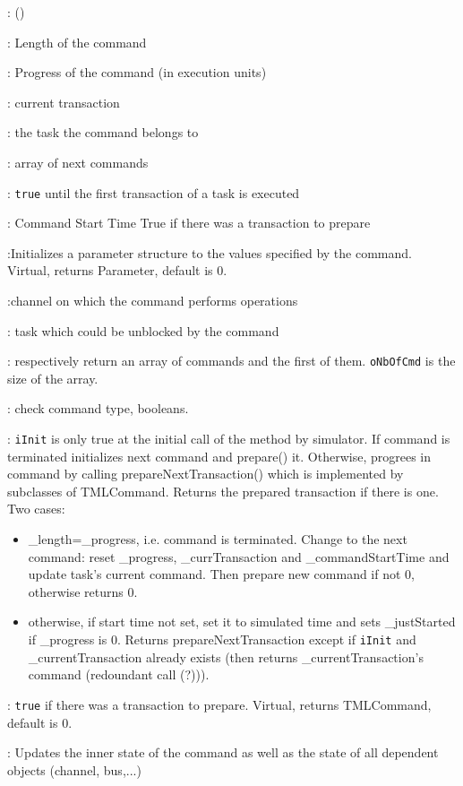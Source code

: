 \documentclass[a4paper,11pt]{article}
\newcommand{\bfont}{\fontseries{b}\selectfont}
\newcommand{\cod}[1]{{\ttfamily #1}}
\newcommand{\class}[2]{\par\vspace{1mm}\hspace{-5mm}\large\colorbox{file}{\textbullet\bfont\cod{#1}:} (\cod{#2})\par}
\newcommand{\method}[1]{\par\vspace{1mm}\hspace{-2mm}\colorbox{method}{\textopenbullet\bfont\cod{#1}:}}
\newcommand{\variable}[1]{\par\vspace{1mm}\hspace{-2mm}\colorbox{variable}{\textopenbullet\bfont\cod{#1}:}}
\begin{document}
\class{TMLCommand}{}
\variable{\_length} Length of the command
\variable{\_progress} Progress of the command (in execution units)
\variable{\_currTransaction} current transaction 
\variable{\_task} the task the command belongs to
\variable{\_nextCommand} array of  next commands
\variable{\_justStarted} {\tt true} until the first transaction of a task is executed
\variable{\_commandStartTime} Command Start Time
True if there was a transaction to prepare
\method{setParams(ioParam)}Initializes a parameter structure to the values specified by the command. Virtual, returns  Parameter, default is 0.
\method{getChannel(iIndex)}channel on which the command performs operations
\method{getDependentTask(iIndex)} task which could be unblocked by the command
\method{getNextCommands(oNbOfCmd), getNextCommands()} respectively return an array of commands and the first of them. {\tt oNbOfCmd} is the size of the array.
\method{isDelayTransaction(), getActiveDelay()} check command type, booleans.
\method{prepare(iInit)} {\tt iInit} is only true at the initial call of the method by simulator. If command is terminated initializes next command and \cod{prepare()} it. Otherwise, progrees in command by calling \cod{prepareNext\-Transaction()} which is implemented by subclasses of TMLCommand. Returns the prepared transaction if there is one. Two cases:
\begin{itemize}
	\item \cod{\_length}=\cod{\_progress}, i.e. command is terminated. Change to the next command: reset \cod{\_progress}, 
	\cod{\_currTransaction} and \cod{\_commandStartTime} and update task's current command. Then prepare new command if not 0, otherwise returns 0.
	\item otherwise, if start time not set, set it to simulated time and sets \cod{\_justStarted} if \cod{\_progress} is 0. Returns \cod{prepareNextTransaction} except if {\tt iInit} and \cod{\_current\-Transaction} already exists (then returns \cod{\_currentTransaction}'s command (redoundant call (?))).
\end{itemize}
\method{prepareNextTransaction()} {\tt true} if there was a transaction to prepare. Virtual, returns  TMLCommand, default is 0.
\method{execute()} Updates the inner state of the command as well as the state of all dependent objects (channel, bus,...)
\end{document}

